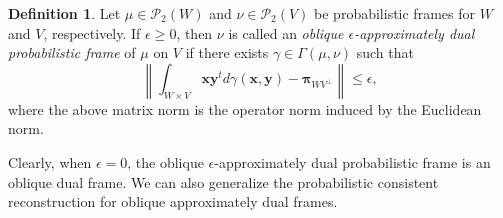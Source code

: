 \documentclass{amsart}
\numberwithin{equation}{section}
\newcommand{\bpi}{{\boldsymbol{\pi}}}
\theoremstyle{plain}
\theoremstyle{remark}
\theoremstyle{definition}
\newtheorem{definition}[theorem]{Definition}
\begin{document}
\begin{definition}
Let $\mu \in \mathcal{P}_2(W)$ and $\nu \in \mathcal{P}_2(V)$ be probabilistic frames for $W$ and $V$, respectively. If $\epsilon \geq 0$, then  $\nu$ is called an \textit{oblique $\epsilon$-approximately dual probabilistic frame} of $\mu$ on $V$ if there exists $\gamma \in \Gamma(\mu, \nu)$ such that
    \begin{equation*}
       \left \| \int_{W \times V} \mathbf{x} \mathbf{y}^t d\gamma(\mathbf{x}, \mathbf{y}) - \bpi_{WV^\perp} \right \| \leq \epsilon,
    \end{equation*}
where the above matrix norm is the operator norm induced by the Euclidean norm. 
\end{definition}
Clearly, when $\epsilon = 0$, the oblique $\epsilon$-approximately dual probabilistic frame is an oblique dual frame.
We can also generalize the probabilistic consistent reconstruction for oblique approximately dual frames.
\end{document}
